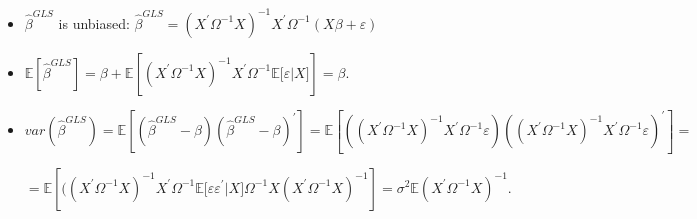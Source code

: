 \documentclass[notes=show]{beamer}
\begin{document}
\begin{frame}%


\begin{itemize}
\item $\widehat{\beta }^{GLS}$ is unbiased: $\widehat{\beta }%
^{GLS}=(X^{\prime }\Omega ^{-1}X)^{-1}X^{\prime }\Omega ^{-1}(X\beta
+\varepsilon )$

\item $\mathbb{E}[\widehat{\beta }^{GLS}]=\beta +\mathbb{E}\left[ (X^{\prime
}\Omega ^{-1}X)^{-1}X^{\prime }\Omega ^{-1}\mathbb{E[}\varepsilon |X]\right]
=\beta .$

\item $var(\widehat{\beta }^{GLS})=\mathbb{E}[(\widehat{\beta }^{GLS}-\beta
)(\widehat{\beta }^{GLS}-\beta )^{\prime }]=\mathbb{E}\left[ ((X^{\prime
}\Omega ^{-1}X)^{-1}X^{\prime }\Omega ^{-1}\varepsilon )((X^{\prime }\Omega
^{-1}X)^{-1}X^{\prime }\Omega ^{-1}\varepsilon )^{\prime }\right] =$

$=\mathbb{E}\left[ ((X^{\prime }\Omega ^{-1}X)^{-1}X^{\prime }\Omega ^{-1}%
\mathbb{E[}\varepsilon \varepsilon ^{\prime }|X]\Omega ^{-1}X(X^{\prime
}\Omega ^{-1}X)^{-1}\right] =\mathbb{\sigma }^{2}\mathbb{E}(X^{\prime
}\Omega ^{-1}X)^{-1}.$
\end{itemize}

\end{frame}%
\end{document}
